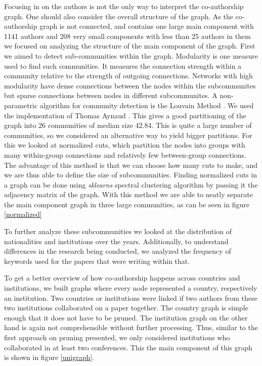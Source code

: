 \documentclass[article,twocolumn]{IEEEtran}
\begin{document}
    Focusing in on the authors is not the only way to interpret the
co-authorship graph. One should also consider the overall structure of
the graph. As the co-authorship graph is not connected, and contains one
large main component with 1141 authors and 208 very small components
with less than 25 authors in them we focused on analyzing the structure
of the main component of the graph. First we aimed to detect
sub-communities within the graph. Modularity is one measure used to find
such communities. It measures the connection strength within a community
relative to the strength of outgoing connections. Networks with high
modularity have dense connections between the nodes within the
subcommunites but sparse connections between nodes in different
subcommunites. A non-parametric algorithm for community detection is the
Louvain Method \cite{blondel2008fast}. We used the implementation of
Thomas Aynaud \cite{louvain}. This gives a good partitioning of the
graph into 26 communities of median size 42.84. This is quite a large
number of communities, so we considered an alternative way to yield
bigger partitions. For this we looked at normalized cuts, which
partition the nodes into groups with many within-group connections and
relatively few between-group connections. The advantage of this method
is that we can choose how many cuts to make, and we are thus able to
define the size of subcommunities. Finding normalized cuts in a graph
can be done using \emph{sklearns} spectral clustering algorithm by
passing it the adjacency matrix of the graph. With this method we are
able to neatly separate the main component graph in three large
communities, as can be seen in figure \ref{normalized}

    To further analyze these subcommunities we looked at the distribution of
nationalities and institutions over the years. Additionally, to
understand differences in the research being conducted, we analyzed the
frequency of keywords used for the papers that were writing within that.

To get a better overview of how co-authorship happens across countries
and institutions, we built graphs where every node represented a
country, respectively an institution. Two countries or institutions were
linked if two authors from these two institutions collaborated on a
paper together. The country graph is simple enough that it does not have
to be pruned. The institution graph on the other hand is again not
comprehensible without further processing. Thus, similar to the first
approach on pruning presented, we only considered institutions who
collaborated in at least two conferences. This the main component of
this graph is shown in figure \ref{unigraph}.
\end{document}
